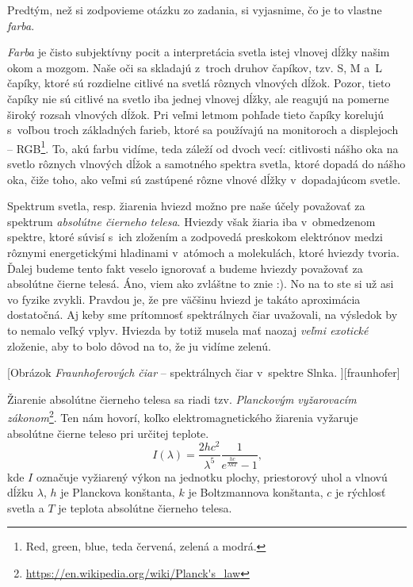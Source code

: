 Predtým, než si zodpovieme otázku zo zadania, si vyjasnime, čo je to vlastne \emph{farba}. 

\emph{Farba} je čisto subjektívny pocit a interpretácia svetla istej vlnovej dĺžky našim okom a mozgom.
Naše oči sa skladajú z~troch druhov čapíkov, tzv. S, M a~L čapíky, ktoré sú rozdielne citlivé na svetlá rôznych vlnových dĺžok.
Pozor, tieto čapíky nie sú citlivé na svetlo iba jednej vlnovej dĺžky, ale reagujú na pomerne široký rozsah vlnových dĺžok.
Pri veľmi letmom pohľade tieto čapíky korelujú s~voľbou troch základných farieb, ktoré sa používajú na monitoroch a displejoch -- RGB\footnote{Red, green, blue, teda červená, zelená a modrá.}.
To, akú farbu vidíme, teda záleží od dvoch vecí: citlivosti nášho oka na svetlo rôznych vlnových dĺžok a samotného spektra svetla,
ktoré dopadá do nášho oka, čiže toho, ako veľmi sú zastúpené rôzne vlnové dĺžky v~dopadajúcom svetle.

Spektrum svetla, resp. žiarenia hviezd možno pre naše účely považovať za spektrum \emph{absolútne čierneho telesa}.
Hviezdy však žiaria iba v~obmedzenom spektre, ktoré súvisí s~ich zložením a zodpovedá preskokom 
elektrónov medzi rôznymi energetickými hladinami v~atómoch a molekulách, ktoré hviezdy tvoria.
Ďalej budeme tento fakt veselo ignorovať a budeme hviezdy považovať za absolútne čierne telesá. Áno, viem ako zvláštne to znie :). No na to ste si už asi vo fyzike zvykli.
Pravdou je, že pre väčšinu hviezd je takáto aproximácia dostatočná.
Aj keby sme prítomnosť spektrálnych čiar uvažovali, na výsledok by to nemalo veľký vplyv.
Hviezda by totiž musela mať naozaj \emph{veľmi exotické} zloženie, aby to bolo dôvod na to, že ju vidíme zelenú. 

[Obrázok \emph{Fraunhoferových čiar} -- spektrálnych čiar v~spektre Slnka.%
][fraunhofer]

Žiarenie absolútne čierneho telesa sa riadi tzv. \emph{Planckovým vyžarovacím zákonom}\footnote{\url{https://en.wikipedia.org/wiki/Planck's_law}}.
Ten nám hovorí, koľko elektromagnetického žiarenia vyžaruje absolútne čierne teleso pri určitej teplote. 
$$
I(\lambda) = \frac{2hc^2}{\lambda^5}\frac{1}{e^{\frac{hc}{\lambda k T}}-1}\text{,}
$$
kde $I$ označuje vyžiarený výkon na jednotku plochy, priestorový uhol a vlnovú dĺžku $\lambda$, $h$ je Planckova konštanta, $k$ je Boltzmannova konštanta, $c$ je rýchlosť svetla a $T$ je teplota absolútne čierneho telesa.

